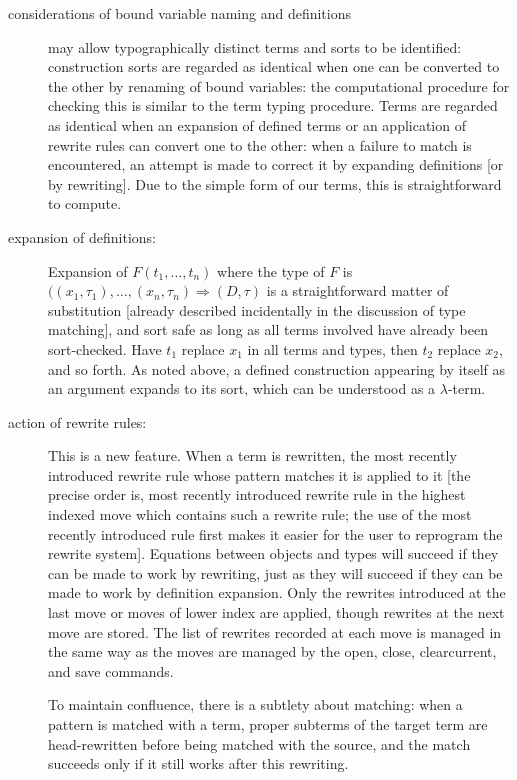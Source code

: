\documentclass[12pt]{article}
\begin{document}
\begin{description}
\item[considerations of bound variable naming and definitions]  may allow typographically distinct terms and sorts to be identified:  construction sorts are regarded as identical when one can be converted to the other by renaming of bound variables:  the computational procedure for checking this is similar to the term typing procedure.   Terms are regarded as identical when an expansion of defined terms or an application of rewrite rules can convert one to the other:  when a failure to match is encountered, an attempt is made to correct it by expanding definitions [or by rewriting].   Due to the simple form of our terms, this is straightforward to compute.

\item[expansion of definitions:]  Expansion of $F(t_1,\ldots,t_n)$ where the type of $F$ is $((x_1,\tau_1),\ldots,(x_n,\tau_n) \Rightarrow (D,\tau)$ is a straightforward matter of substitution [already described incidentally in the discussion of type matching], and sort safe as long as all terms involved have already been sort-checked.  Have $t_1$ replace $x_1$ in all terms and types, then $t_2$ replace $x_2$, and so forth.
As noted above, a defined construction appearing by itself as an argument expands to its sort, which can be understood as a $\lambda$-term.

\item[action of rewrite rules:]  This is a new feature.  When a term is rewritten, the most recently introduced rewrite rule whose pattern matches it is applied to it [the precise order is, most recently introduced rewrite rule in the highest indexed move which contains such a rewrite rule; the use of the most recently introduced rule first makes it easier for the user to reprogram the rewrite system].  Equations between objects and types will succeed if they can be made to work by rewriting, just as they will succeed if they can be made to work by definition expansion.  Only the rewrites introduced at the last move or moves of lower index are applied, though rewrites at the next move are stored.  The list of rewrites recorded at each move is managed in the same way as the moves are managed by the open, close, clearcurrent, and save commands.

To maintain confluence, there is a subtlety about matching:  when a pattern is matched with a term, proper subterms of the target term are head-rewritten before being matched with the source, and the match succeeds only if it still works after this rewriting.


\end{description}
\end{document}
